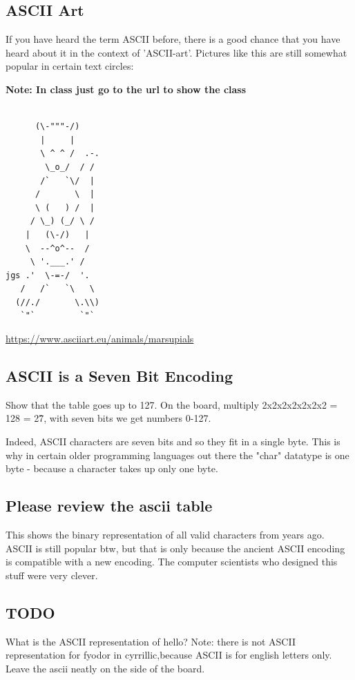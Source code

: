 \documentclass[12pt]{article}
\begin{document}
\subsection{ASCII Art}
If you have heard the term ASCII before, there is a good chance that you have heard about it in the context of 'ASCII-art'. Pictures like this are still somewhat popular in certain text circles:

\textbf{Note: In class just go to the url to show the class}

\begin{lstlisting}

      (\-"""-/)
       |     |
       \ ^ ^ /  .-.
        \_o_/  / /
       /`   `\/  |
      /       \  |
      \ (   ) /  |
     / \_) (_/ \ /
    |   (\-/)   |
    \  --^o^--  /
     \ '.___.' /
jgs .'  \-=-/  '.
   /   /`   `\   \
  (//./       \.\\)
   `"`         `"`

\end{lstlisting}

\url{https://www.asciiart.eu/animals/marsupials}

\subsection{ASCII is a Seven Bit Encoding}
Show that the table goes up to 127. On the board, multiply 2x2x2x2x2x2x2 = 128 = 2\^7, with seven bits we get numbers 0-127.

Indeed, ASCII characters are seven bits and so they fit in a single byte. This
is why in certain older programming languages out there the "char" datatype is
one byte - because a character takes up only one byte.

\subsection{Please review the ascii table}
This shows the binary representation of all valid characters from years ago.
ASCII is still popular btw, but that is only because the ancient ASCII encoding
is compatible with a new encoding. The computer scientists who designed this
stuff were very clever.


\subsection{TODO}
What is the ASCII representation of hello?
Note: there is not ASCII representation for fyodor in cyrrillic,because ASCII is
for english letters only.
Leave the ascii neatly on the side of the board.
\end{document}
